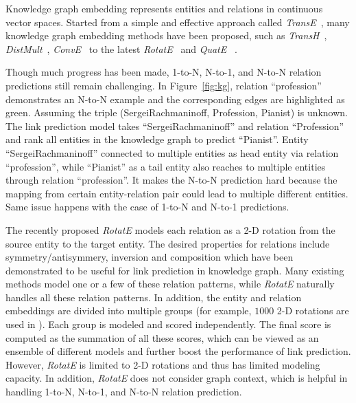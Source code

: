 \documentclass[11pt,a4paper]{article}
\begin{document}
Knowledge graph embedding represents entities and relations in continuous vector spaces.
Started from a simple and effective approach called {\it TransE}~\cite{bordes2013translating}, many knowledge graph embedding methods have been proposed, such as {\it TransH}~\cite{wang2014knowledge}, {\it DistMult}~\cite{yang2014distmult}, {\it ConvE}~\cite{dettmers2017conve} to the latest {\it RotatE}~\cite{Sun2019RotatEKG} and {\it QuatE }~\cite{zhang2019quaternion}.


Though much progress has been made, 1-to-N, N-to-1, and N-to-N relation predictions \cite{bordes2013translating,wang2014knowledge} still remain challenging. In Figure~\ref{fig:kg}, relation ``profession'' demonstrates an N-to-N example and the corresponding edges are highlighted as green. Assuming the triple (SergeiRachmaninoff, Profession, Pianist) is unknown.
The link prediction model takes ``SergeiRachmaninoff'' and relation ``Profession'' and rank all entities in the knowledge graph to predict ``Pianist''. Entity ``SergeiRachmaninoff'' connected to multiple  entities as head entity via relation ``profession'', while ``Pianist'' as a tail entity also reaches to multiple entities through relation ``profession''. It makes the N-to-N prediction hard because the mapping from certain entity-relation pair could lead to multiple different entities.
Same issue happens with the case of 1-to-N and N-to-1 predictions.

The recently proposed {\it RotatE} \cite{Sun2019RotatEKG} models each relation as a 2-D rotation from the source entity to the target entity.
The desired properties for relations include symmetry/antisymmery, inversion and composition which have been demonstrated to be useful for link prediction in knowledge graph. Many existing methods model one or a few of these relation patterns, while {\it RotatE} naturally handles all these relation patterns. 
In addition, the entity and relation embeddings are divided into multiple groups (for example, $1000$ 2-D rotations are used in \cite{Sun2019RotatEKG}). 
Each group is modeled and scored independently. The final score is computed as the summation of all these scores, which can be viewed as an ensemble of different models and further boost the performance of link prediction. However, {\it RotatE} is limited to 2-D rotations and thus has limited modeling capacity. In addition, {\it RotatE} does not consider graph context, which is helpful in handling 1-to-N, N-to-1, and N-to-N relation prediction.
 
\end{document}
